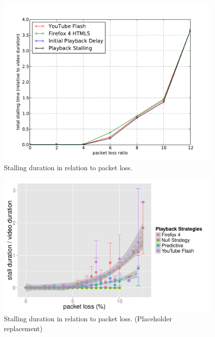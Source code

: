 


\begin{figure}[htb]
    \centering
    \includegraphics[width=\textwidth]{images/eval-loss4mb-stallingtime.pdf}
    \caption{Stalling duration in relation to packet loss.}
    \label{c3:fig:eval-loss-stallingtime}
\end{figure}

\begin{figure}[htb]
    \centering
    \includegraphics[width=\textwidth]{images/R-playbackemulation-stallduration-loss.pdf}
    \caption{Stalling duration in relation to packet loss. (Placeholder replacement)}
    \label{c3:fig:eval-loss-stallingtime-R}
\end{figure}


